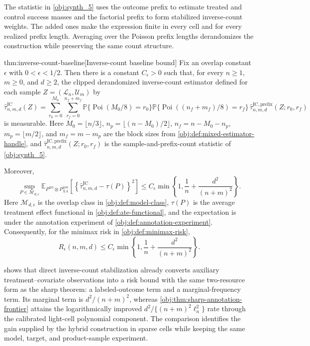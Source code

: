 \documentclass[11pt]{article}
\begin{document}
The statistic in \cref{obj:synth_5} uses the outcome prefix to estimate treated and control success masses and the factorial prefix to form stabilized inverse-count weights. The added ones make the expression finite in every cell and for every realized prefix length. Averaging over the Poisson prefix lengths derandomizes the construction while preserving the same count structure.

\begin{theoremv}{thm:inverse-count-baseline}[Inverse-count baseline bound]
Fix an overlap constant \(\epsilon\) with \(0<\epsilon<1/2\).  Then there is a constant \(C_\epsilon>0\) such that, for every \(n\ge1\), \(m\ge0\), and \(d\ge2\), the clipped derandomized inverse-count estimator defined for each sample \(Z=(\mathcal L_n,\mathcal U_m)\) by
\[
\widehat\tau^{\mathrm{IC}}_{n,m,d}(Z)
=
\sum_{r_0=0}^{M_0}
\sum_{r_f=0}^{n_f+m_f}
\mathbb P\{\operatorname{Poi}(M_0/8)=r_0\}
\mathbb P\{\operatorname{Poi}((n_f+m_f)/8)=r_f\}
\,\widehat\tau^{\mathrm{IC,prefix}}_{n,m,d}(Z;r_0,r_f)
\]
is measurable.  Here \(M_0=\lfloor n/3\rfloor\), \(n_p=\lfloor(n-M_0)/2\rfloor\), \(n_f=n-M_0-n_p\), \(m_p=\lfloor m/2\rfloor\), and \(m_f=m-m_p\) are the block sizes from \cref{obj:def:mixed-estimator-handle}, and \(\widehat\tau^{\mathrm{IC,prefix}}_{n,m,d}(Z;r_0,r_f)\) is the sample-and-prefix-count statistic of \cref{obj:synth_5}.

Moreover,
\[
\sup_{P\in\mathcal M_{d,\epsilon}}
\mathbb E_{P^{\otimes n}\otimes P_{XA}^{\otimes m}}
\left[
\left\{
\widehat\tau^{\mathrm{IC}}_{n,m,d}-\tau(P)
\right\}^2
\right]
\le
C_\epsilon
\min\left\{
1,\frac1n+\frac{d^2}{(n+m)^2}
\right\}.
\]
Here \(\mathcal M_{d,\epsilon}\) is the overlap class in \cref{obj:def:model-class}, \(\tau(P)\) is the average treatment effect functional in \cref{obj:def:ate-functional}, and the expectation is under the annotation experiment of \cref{obj:def:annotation-experiment}.  Consequently, for the minimax risk in \cref{obj:def:minimax-risk},
\[
R_\epsilon(n,m,d)
\le
C_\epsilon
\min\left\{
1,\frac1n+\frac{d^2}{(n+m)^2}
\right\}.
\]
\end{theoremv}

 shows that direct inverse-count stabilization already converts auxiliary treatment--covariate observations into a risk bound with the same two-resource form as the sharp theorem: a labeled-outcome term and a marginal-frequency term. Its marginal term is \(d^2/(n+m)^2\), whereas \cref{obj:thm:sharp-annotation-frontier} attains the logarithmically improved \(d^2/\{(n+m)^2\ell_n^2\}\) rate through the calibrated light-cell polynomial component. The comparison identifies the gain supplied by the hybrid construction in sparse cells while keeping the same model, target, and product-sample experiment.
\end{document}

